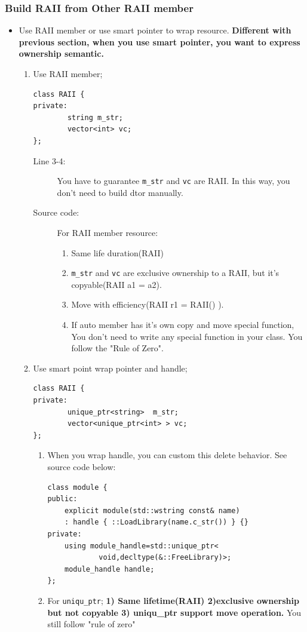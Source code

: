 \documentclass[a4paper,11pt,twoside]{book}
\begin{document}
\subsubsection{Build RAII from Other RAII member}
\begin{itemize}
		\item Use RAII member or use smart pointer to wrap resource. \textbf{Different with previous section, when you use smart pointer, you want to express ownership semantic.}

	\begin{enumerate}
		\item Use RAII member; 
\begin{lstlisting}[]
class RAII {
private:
		string m_str;
		vector<int> vc;
};
\end{lstlisting}
			\begin{description}
				\item[Line 3-4:] You have to guarantee \texttt{m\_str} and \texttt{vc} are RAII.  In this way, you don't need to build dtor manually.
				
				\item[Source code:] For RAII member resource:
				\begin{enumerate}
					\item Same life duration(RAII)
					\item \texttt{m\_str} and \texttt{vc} are exclusive ownership to a RAII, but it's copyable(RAII a1 = a2).
					\item Move with efficiency(RAII r1 = RAII() ). 
					\item If auto member has it's own copy and move special function, You don't need to write any special function in your class. You follow the "Rule of Zero".
				\end{enumerate}
			\end{description}
		
				
		\item Use smart point wrap pointer and handle;
\begin{lstlisting}[numbers=none]
class RAII {
private:
		unique_ptr<string>  m_str;
		vector<unique_ptr<int> > vc;
};
		\end{lstlisting}
\begin{enumerate}
	\item  When you wrap handle, you can custom this delete behavior. See source code below:
\begin{lstlisting}[numbers=none]
class module {
public:
	explicit module(std::wstring const& name)
	: handle { ::LoadLibrary(name.c_str()) } {}
private:
	using module_handle=std::unique_ptr<
			void,decltype(&::FreeLibrary)>;
	module_handle handle;
};
\end{lstlisting}
			\item For \texttt{uniqu\_ptr}; \textbf{1) Same lifetime(RAII) 2)exclusive ownership but not copyable 3) uniqu\_ptr support move operation. } You still follow "rule of zero"


\end{enumerate}
\end{enumerate}
\end{itemize}
\end{document}
